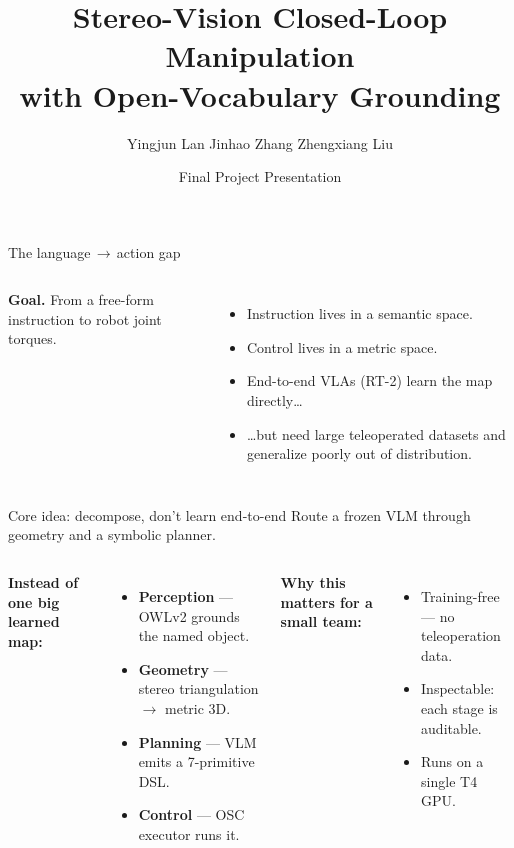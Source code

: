 \documentclass[aspectratio=169,10pt]{beamer}
\title[Stereo-VLM Manipulation]{Stereo-Vision Closed-Loop Manipulation\\with Open-Vocabulary Grounding}
\author{Yingjun Lan \quad Jinhao Zhang \quad Zhengxiang Liu}
\institute{School of Artificial Intelligence, Shanghai Jiao Tong University}
\date{Final Project Presentation}
\begin{document}
\begin{frame}[plain]
\titlepage
\end{frame}

\begin{frame}{The language$\,\to\,$action gap}
\begin{columns}[T,onlytextwidth]
\textbf{Goal.} From a free-form instruction to robot joint torques.
\vspace{4pt}
\begin{itemize}
    \item Instruction lives in a \alert{semantic} space.
    \item Control lives in a \alert{metric} space.
    \item End-to-end VLAs (RT-2) learn the map directly\dots
    \item \dots but need \alert{large teleoperated datasets} and generalize poorly out of distribution.
\end{itemize}
\centering
{}
\end{columns}
\end{frame}

\begin{frame}{Core idea: decompose, don't learn end-to-end}
Route a \alert{frozen} VLM through geometry and a symbolic planner.
\vspace{8pt}
\begin{columns}[T,onlytextwidth]
\textbf{Instead of one big learned map:}
\begin{itemize}
    \item \textbf{Perception} --- OWLv2 grounds the named object.
    \item \textbf{Geometry} --- stereo triangulation $\to$ metric 3D.
    \item \textbf{Planning} --- VLM emits a 7-primitive DSL.
    \item \textbf{Control} --- OSC executor runs it.
\end{itemize}
\textbf{Why this matters for a small team:}
\begin{itemize}
    \item \alert{Training-free} --- no teleoperation data.
    \item Inspectable: each stage is auditable.
    \item Runs on a single T4 GPU.
\end{itemize}
\end{columns}
\end{frame}
\end{document}

